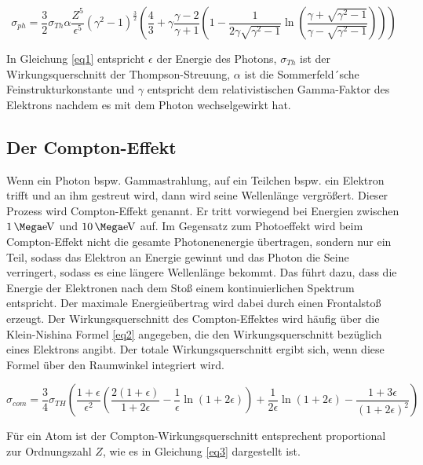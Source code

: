 \begin{equation}
    \sigma_{ph} = \frac{3}{2} \sigma_{Th} \alpha \frac{Z^5}{\epsilon^5} (\gamma^2 -1)^{\frac{3}{2}} \left(\frac{4}{3} + \gamma\frac{\gamma -2}{\gamma+1} \left(1 - \frac{1}{2 \gamma \sqrt{\gamma^2 -1}} \ln\left(\frac{\gamma + \sqrt{\gamma^2 - 1}}{\gamma - \sqrt{\gamma^2 -1}} \right) \right) \right)
    \label{eq1}
\end{equation}

In Gleichung \ref{eq1} entspricht $\epsilon$ der Energie des Photons, $\sigma_{Th}$
ist der Wirkungsquerschnitt der Thompson-Streuung, $\alpha$ ist die 
Sommerfeld´sche Feinstrukturkonstante und $\gamma$ entspricht dem relativistischen 
Gamma-Faktor des Elektrons nachdem es mit dem Photon wechselgewirkt hat.

\subsection{Der Compton-Effekt}
Wenn ein Photon bspw. Gammastrahlung, auf ein Teilchen bspw. ein Elektron trifft
und an ihm gestreut wird, dann wird seine Wellenlänge vergrößert. 
Dieser Prozess wird Compton-Effekt genannt.
Er tritt vorwiegend bei Energien zwischen $\SI{1}{\Mega\electronvolt}$ und 
$\SI{10}{\Mega\electronvolt}$ auf.
Im Gegensatz zum Photoeffekt wird beim Compton-Effekt nicht die 
gesamte Photonenenergie übertragen, sondern nur ein Teil, sodass das Elektron an 
Energie gewinnt und das Photon die Seine verringert, sodass es eine längere 
Wellenlänge bekommt. Das führt dazu, dass die Energie der Elektronen nach dem 
Stoß einem kontinuierlichen Spektrum entspricht.
Der maximale Energieübertrag wird dabei durch einen Frontalstoß erzeugt.
Der Wirkungsquerschnitt des Compton-Effektes wird häufig über die 
Klein-Nishina Formel \ref{eq2} angegeben, die den Wirkungsquerschnitt bezüglich 
eines Elektrons angibt. Der totale Wirkungsquerschnitt ergibt sich, wenn diese 
Formel über den Raumwinkel integriert wird.

\begin{equation}
    \sigma_{com} = \frac{3}{4}\sigma_{TH} \left(\frac{1 + \epsilon}{\epsilon^2} \left(\frac{2(1+\epsilon)}{1+2\epsilon} - \frac{1}{\epsilon} \ln(1+2\epsilon) \right) + \frac{1}{2\epsilon} \ln(1+2\epsilon) - \frac{1+3\epsilon}{(1+2\epsilon)^2} \right)
    \label{eq2}
\end{equation}

Für ein Atom ist der Compton-Wirkungsquerschnitt entsprechent proportional zur 
Ordnungszahl $Z$, wie es in Gleichung \ref{eq3} dargestellt ist.

